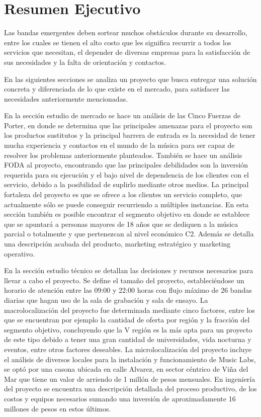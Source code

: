\section{Resumen Ejecutivo}

	Las bandas emergentes deben sortear muchos obstáculos durante su desarrollo, entre los cuales se tienen el alto costo que les significa recurrir a todos 
	los servicios que necesitan, el depender de diversas empresas para la satisfacción de sus necesidades y la falta de orientación y contactos.
	
	En las siguientes secciones se analiza un proyecto que busca entregar una solución concreta y diferenciada de lo que existe en el mercado, 
	para satisfacer las necesidades anteriormente mencionadas.

	En la sección estudio de mercado se hace un análisis de las Cinco Fuerzas de Porter, en donde se determina que las principales amenazas para 
	el proyecto son los productos sustitutos y la principal barrera de entrada
es la necesidad de tener mucha experiencia y contactos en el mundo de la música
para ser capaz de resolver los problemas anteriormente planteados. También se
hace un análisis FODA al proyecto, encontrando que las principales debilidades
son la inversión requerida para su ejecución y el bajo nivel de dependencia de
los clientes con el servicio, debido a la posibilidad de suplirlo mediante
otros medios. La principal fortaleza del proyecto es que se ofrece a los
clientes un servicio completo, que actualmente sólo se puede conseguir
recurriendo a múltiples instancias. En esta sección también es posible
encontrar el segmento objetivo en donde se establece que se apuntará a personas
mayores de 18 años que se dediquen a la música parcial o totalmente y que
pertenezcan al nivel económico C2. Además se detalla una descripción acabada
del producto, marketing estratégico y marketing operativo.


	En la sección estudio técnico se detallan las decisiones y recursos necesarios para llevar a cabo el proyecto.
	 Se define el tamaño del proyecto, estableciéndose un horario de atención
entre las 09:00 y 22:00 horas con flujo máximo de 26 bandas diarias que hagan
	 uso de la sala de grabación y sala de ensayo.
	 La macrolocalización del proyecto fue determinada mediante cinco factores, 
	 entre los que se encuentran por ejemplo la cantidad de oferta por región y la fracción del segmento objetivo, 
	concluyendo que la V región es la más apta para un proyecto de este tipo debido a tener una gran cantidad de universidades, vida nocturna y eventos, 
	entre otros factores deseables. La microlocalización del proyecto incluye el análisis de diversos locales para la instalación y funcionamiento de Music Labs,
	 se optó por una casona ubicada en calle Alvarez, en sector céntrico de Viña del Mar que tiene un valor de arriendo de 1 millón de pesos mensuales. 
	En ingeniería del proyecto se encuentra una descripción detallada del proceso productivo, de los costos y equipos necesarios sumando una inversión de aproximadamente 16 millones de pesos en estos últimos. 

